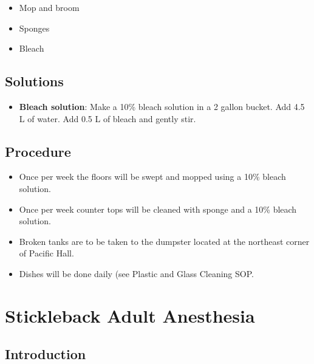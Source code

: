 \documentclass[
  letterpaper,
  DIV=11,
  numbers=noendperiod]{scrreprt}
\providecommand{\tightlist}{%
  \setlength{\itemsep}{0pt}\setlength{\parskip}{0pt}}\usepackage{longtable,booktabs,array}
\begin{document}
\begin{itemize}
\tightlist
\item
  Mop and broom
\item
  Sponges
\item
  Bleach
\end{itemize}

\hypertarget{solutions-18}{%
\section{Solutions}\label{solutions-18}}

\begin{itemize}
\tightlist
\item
  \textbf{Bleach solution}: Make a 10\% bleach solution in a 2 gallon
  bucket. Add 4.5 L of water. Add 0.5 L of bleach and gently stir.
\end{itemize}

\hypertarget{procedure-24}{%
\section{Procedure}\label{procedure-24}}

\begin{itemize}
\tightlist
\item
  Once per week the floors will be swept and mopped using a 10\% bleach
  solution.
\item
  Once per week counter tops will be cleaned with sponge and a 10\%
  bleach solution.
\item
  Broken tanks are to be taken to the dumpster located at the northeast
  corner of Pacific Hall.
\item
  Dishes will be done daily (see
  \protect\hypertarget{sec-husbandry-Plastic_Glassware_cleaning-bleach}{}{Plastic
  and Glass Cleaning SOP}.
\end{itemize}

\hypertarget{sec-sb_adult_anesthisia}{%
\chapter{Stickleback Adult Anesthesia}\label{sec-sb_adult_anesthisia}}

\hypertarget{introduction-25}{%
\section{Introduction}\label{introduction-25}}
\end{document}
